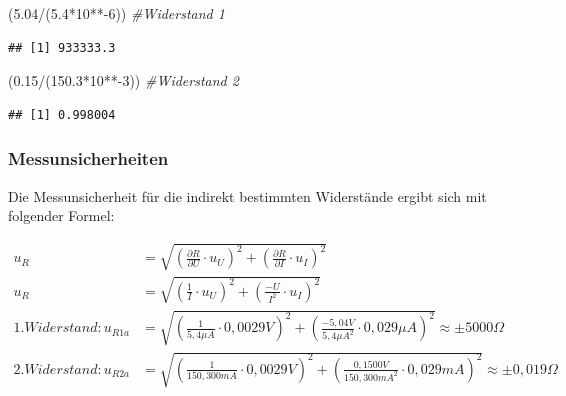 \documentclass[
  9pt,
]{article}
\newenvironment{Shaded}{\begin{snugshade}}{\end{snugshade}}
\newcommand{\CommentTok}[1]{\textcolor[rgb]{0.56,0.35,0.01}{\textit{#1}}}
\newcommand{\DecValTok}[1]{\textcolor[rgb]{0.00,0.00,0.81}{#1}}
\newcommand{\FloatTok}[1]{\textcolor[rgb]{0.00,0.00,0.81}{#1}}
\newcommand{\NormalTok}[1]{#1}
\newcommand{\SpecialCharTok}[1]{\textcolor[rgb]{0.00,0.00,0.00}{#1}}
\begin{document}
\begin{Shaded}
\begin{Highlighting}[]
\NormalTok{(}\FloatTok{5.04}\SpecialCharTok{/}\NormalTok{(}\FloatTok{5.4}\SpecialCharTok{*}\DecValTok{10}\SpecialCharTok{**{-}}\DecValTok{6}\NormalTok{)) }\CommentTok{\#Widerstand 1}
\end{Highlighting}
\end{Shaded}

\begin{verbatim}
## [1] 933333.3
\end{verbatim}

\begin{Shaded}
\begin{Highlighting}[]
\NormalTok{(}\FloatTok{0.15}\SpecialCharTok{/}\NormalTok{(}\FloatTok{150.3}\SpecialCharTok{*}\DecValTok{10}\SpecialCharTok{**{-}}\DecValTok{3}\NormalTok{)) }\CommentTok{\#Widerstand 2}
\end{Highlighting}
\end{Shaded}

\begin{verbatim}
## [1] 0.998004
\end{verbatim}

\hypertarget{messunsicherheiten}{%
\subsubsection{Messunsicherheiten}\label{messunsicherheiten}}

Die Messunsicherheit für die indirekt bestimmten Widerstände ergibt sich
mit folgender Formel:

\begin {equation*}
\begin{split}
u_R &= \sqrt{\left (\frac{\partial R}{\partial U} \cdot u_U\right )^2 + \left (\frac{\partial R}{\partial I} \cdot u_I\right )^2 } \\
u_R &= \sqrt{\left (\frac{1}{I} \cdot u_U\right )^2 + \left (\frac{-U}{I^2} \cdot u_I\right )^2 } \\
1.Widerstand: u_{R1a}&= \sqrt{\left (\frac{1}{5,4\mu A} \cdot 0,0029V\right )^2 + \left (\frac{-5,04V}{5,4\mu A^2} \cdot 0,029 \mu A\right )^2 } \approx \pm 5000\Omega \\
2.Widerstand: u_{R2a}&= \sqrt{\left (\frac{1}{150,300mA} \cdot 0,0029V \right )^2 + \left (\frac{0,1500V}{150,300mA^2} \cdot 0,029mA\right )^2 } \approx \pm 0,019 \Omega
\end{split}
\end{equation*}
\end{document}
